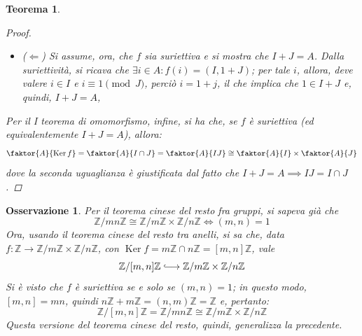 \documentclass[12pt]{scrartcl}
\theoremstyle{style}
\newtheorem{teorema}{Teorema}[section]
\newtheorem{osservazione}{Osservazione}[section]
\numberwithin{equation}{subsection}
\newcommand{\longhookrightarrow}{\lhook\joinrel\longrightarrow}
\begin{document}
\begin{teorema}
\begin{proof}
\begin{itemize}
			Visto che $x \in A= I+J$, allora si pu\`o scrivere come $x = bi + aj$, per qualche $i \in I$ e $j\in J$, quindi:
			\[
				f(x) = (\underbracket{bi}_{\in I}  + aj + I, bi+ \underbracket{aj}_{\in J}  + j) = (aj+I,bi+J)
			\] 
			Notando, poi, che $1 = i + j\Leftarrow i= 1-j$ e $j=1-i$, si ha:
			\[
				(aj +I , bi+J) = (a(1-i) + I, b(1-j) + J) = (a+I,b_J)
			\] 
			pertanto $f$ \`e suriettiva.
		\item ($\Leftarrow $) Si assume, ora, che $f$ sia suriettiva e si mostra che $I+J = A$.
			Dalla suriettivit\`a, si ricava che $\exists i \in A : f(i) = (I,1+J)$; per tale $i$, allora, deve valere $i \in I$ e $i\equiv 1 \pmod{J} $, perci\`o $i = 1+j$, il che implica che $1 \in I+J$ e, quindi, $I+J=A$,
	\end{itemize}
	Per il I teorema di omomorfismo, infine, si ha che, se $f$ \`e suriettiva (ed equivalentemente $I+J = A$), allora:
	\[
		\faktor{A}{\operatorname{Ker} f}=\faktor{A}{I\cap J}=\faktor{A}{I J}\cong \faktor{A}{I} \times \faktor{A}{J}
	\] 
	dove la seconda uguaglianza \`e giustificata dal fatto che $I+J = A \implies IJ = I\cap J$.
	\end{proof}
\end{teorema}
\begin{osservazione}
Per il teorema cinese del resto fra gruppi, si sapeva gi\`a che 
\[
\mathbb{Z}/mn\mathbb{Z} \cong \mathbb{Z} / m\mathbb{Z}\times \mathbb{Z}/n\mathbb{Z} \iff (m,n) = 1
\] 
Ora, usando il teorema cinese del resto tra anelli, si sa che, data $f:\mathbb{Z}\longrightarrow \mathbb{Z}/ m \mathbb{Z} \times  \mathbb{Z}/ n \mathbb{Z}$, con $\operatorname{Ker} f = m\mathbb{Z} \cap n \mathbb{Z} = [m,n]\mathbb{Z}$, vale
\[
	\mathbb{Z}/[m,n]\mathbb{Z}\longhookrightarrow \mathbb{Z}/ m\mathbb{Z}\times \mathbb{Z}/n\mathbb{Z}
\] 
Si \`e visto che $f$ \`e suriettiva se e solo se $(m,n) = 1$; in questo modo, $[m,n] = mn$, quindi $n\mathbb{Z}+m\mathbb{Z}= (n,m)\mathbb{Z}=\mathbb{Z}$ e, pertanto:
\[
	\mathbb{Z}/ [m,n]\mathbb{Z}= \mathbb{Z}/ mn\mathbb{Z}\cong \mathbb{Z}/ m\mathbb{Z}\times \mathbb{Z}/n\mathbb{Z}
\] 
Questa versione del teorema cinese del resto, quindi, generalizza la precedente.
\end{osservazione}
\end{document}
